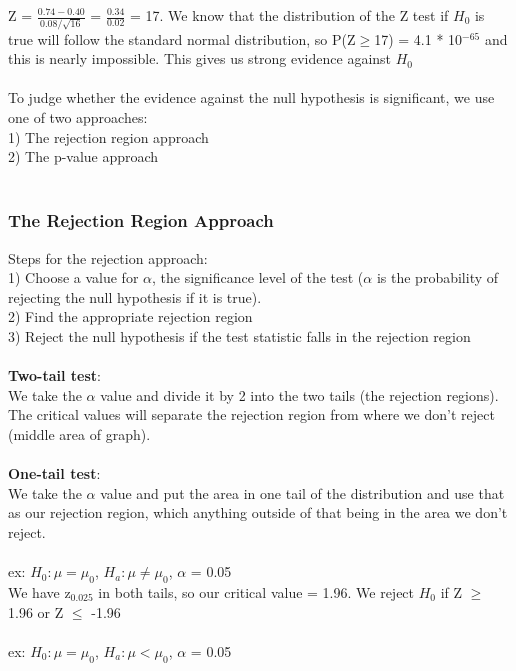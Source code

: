 \documentclass[12pt, a4paper]{article}
\begin{document}
		Z = $\frac{0.74 - 0.40}{0.08/\sqrt{16}}$ = $\frac{0.34}{0.02}$ = 17. We know that the distribution of the Z test if $H_0$ is true will follow the standard normal distribution, so P(Z$\geq$17) = 4.1 * 10$^{-65}$ and this is nearly impossible. This gives us strong evidence against $H_0$ \\~\\
		To judge whether the evidence against the null hypothesis is significant, we use one of two approaches: \\
		1) The rejection region approach \\
		2) The p-value approach \\~\\
		
		\subsubsection{The Rejection Region Approach}
		Steps for the rejection approach: \\
		1) Choose a value for $\alpha$, the significance level of the test ($\alpha$ is the probability of rejecting the \hspace*{4mm} null hypothesis if it is true). \\
		2) Find the appropriate rejection region \\
		3) Reject the null hypothesis if the test statistic falls in the rejection region \\~\\
		\textbf{Two-tail test}: \\
		We take the $\alpha$ value and divide it by 2 into the two tails (the rejection regions). The critical values will separate the rejection region from where we don't reject (middle area of graph). \\~\\
		\textbf{One-tail test}: \\
		We take the $\alpha$ value and put the area in one tail of the distribution and use that as our rejection region, which anything outside of that being in the area we don't reject. \\~\\
		ex: $H_0 : \mu = \mu_0$, $H_a: \mu \neq \mu_0$, $\alpha$ = 0.05 \\
		We have z$_{0.025}$ in both tails, so our critical value = 1.96. We reject $H_0$ if Z $\geq$ 1.96 or Z $\leq$ -1.96 \\~\\
		ex: $H_0 : \mu = \mu_0$, $H_a: \mu < \mu_0$, $\alpha$ = 0.05 \\
\end{document}
